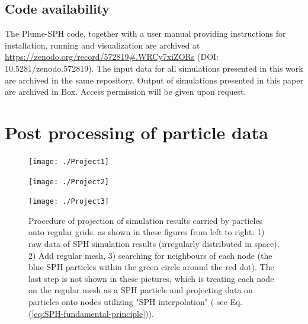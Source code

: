 \documentclass[gmd, manuscript]{copernicus}
\begin{document}
\subsection{Code availability}
The Plume-SPH code, together with a user manual providing instructions for installation, running and visualization are archived at \url{ https://zenodo.org/record/572819#.WRCy7xiZORs} (DOI: 10.5281/zenodo.572819). The input data for all simulations presented in this work are archived in the same repository. Output of simulations presented in this paper are archived in Box. Access permission will be given upon request.


\appendix
\section{Post processing of particle data} \label{app:project-SPH-grid}    %
\appendixfigures
\begin{figure}[!htb]
    \centering
    \begin{minipage}{.325\textwidth}
        \centering
        \texttt{[image: ./Project1]}
    \end{minipage}%
    \begin{minipage}{.325 \textwidth}
        \centering
        \texttt{[image: ./Project2]}
    \end{minipage}%
    \begin{minipage}{.325 \textwidth}
        \centering
        \texttt{[image: ./Project3]}
    \end{minipage}%
    \caption{Procedure of projection of simulation results carried by particles onto regular grids. as shown in these figures from left to right: 1) raw data of SPH simulation results (irregularly distributed in space), 2) Add regular mesh, 3) searching for neighbours of each node (the blue SPH particles within the green circle around the red dot). The last step is not shown in these pictures, which is treating each node on the regular mesh as a SPH particle and projecting data on particles onto nodes utilizing "SPH interpolation" ( see Eq. (\ref{eq:SPH-fundamental-principle})).}
    \label{appfig:1D-shock-tests-verification}
\end{figure}
\end{document}
